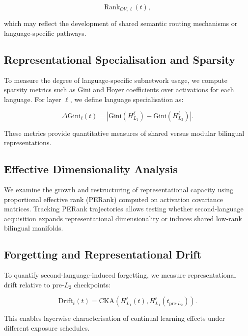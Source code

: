 \begin{equation}
\text{Rank}_{OV,\ell}(t),
\end{equation}

which may reflect the development of shared semantic routing mechanisms or language-specific pathways.

\subsection{Representational Specialisation and Sparsity}

To measure the degree of language-specific subnetwork usage, we compute sparsity metrics such as Gini and Hoyer coefficients over activations for each language. For layer \( \ell \), we define language specialisation as:

\begin{equation}
\Delta \text{Gini}_\ell(t) =
\left|
\text{Gini}(H^\ell_{L_1}) - \text{Gini}(H^\ell_{L_2})
\right|.
\end{equation}

These metrics provide quantitative measures of shared versus modular bilingual representations.

\subsection{Effective Dimensionality Analysis}

We examine the growth and restructuring of representational capacity using proportional effective rank (PERank) computed on activation covariance matrices. Tracking PERank trajectories allows testing whether second-language acquisition expands representational dimensionality or induces shared low-rank bilingual manifolds.

\subsection{Forgetting and Representational Drift}

To quantify second-language-induced forgetting, we measure representational drift relative to pre-\( L_2 \) checkpoints:

\begin{equation}
\text{Drift}_\ell(t) =
\text{CKA}(H^\ell_{L_1}(t), H^\ell_{L_1}(t_{\text{pre-}L_2})).
\end{equation}

This enables layerwise characterisation of continual learning effects under different exposure schedules.

